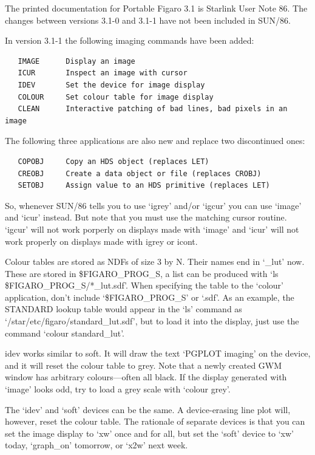 \documentclass[11pt,twoside]{article}
\newcommand{\latorhtm}[2]{#1}
\newcommand{\latorhtm}[2]{#2}
\begin{document}
   The printed documentation for Portable Figaro 3.1 is Starlink User
   Note 86. The changes between versions 3.1-0 and 3.1-1 have not been
   included in SUN/86.

   In version 3.1-1 the following imaging commands have been added:

\begin{verbatim}
   IMAGE      Display an image
   ICUR       Inspect an image with cursor
   IDEV       Set the device for image display
   COLOUR     Set colour table for image display
   CLEAN      Interactive patching of bad lines, bad pixels in an image
\end{verbatim}

   The following three applications are also new and replace two
   discontinued ones:

\begin{verbatim}
   COPOBJ     Copy an HDS object (replaces LET)
   CREOBJ     Create a data object or file (replaces CROBJ)
   SETOBJ     Assign value to an HDS primitive (replaces LET)
\end{verbatim}

   So, whenever SUN/86 tells you to use `igrey' and/or `igcur' you can
   use `image' and `icur' instead. But note that you must use the
   matching cursor routine. `igcur' will not work porperly on displays
   made with `image' and `icur' will not work properly on displays made
   with igrey or icont.

   Colour tables are stored as NDFs of size 3 by N. Their names end in
   `\_lut' now. These are stored in \$FIGARO\_PROG\_S, a list can be
   produced with `ls \$FIGARO\_PROG\_S/*\_lut.sdf'. When specifying the
   table to the `colour' application, don't include `\$FIGARO\_PROG\_S' or
   `.sdf'. As an example, the STANDARD lookup table would appear in the
   `ls' command as `/star/etc/figaro/standard\_lut.sdf', but to load it
   into the display, just use the command `colour standard\_lut'.

   idev works similar to soft. It will draw the text `PGPLOT imaging' on
   the device, and it will reset the colour table to grey. Note that a
   newly created GWM window has arbitrary colours\latorhtm{---}{-}often all
   black. If
   the display generated with `image' looks odd, try to load a grey
   scale with `colour grey'.

   The `idev' and `soft' devices can be the same. A device-erasing line
   plot will, however, reset the colour table. The rationale of separate
   devices is that you can set the image display to `xw' once and for
   all, but set the `soft' device to `xw' today, `graph\_on' tomorrow, or
   `x2w' next week.
\end{document}
